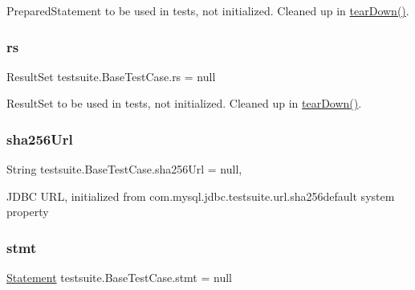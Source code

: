 Prepared\+Statement to be used in tests, not initialized. Cleaned up in \mbox{\hyperlink{classtestsuite_1_1_base_test_case_a51c7d76ab24b0c966f956250fd7a4f52}{tear\+Down()}}. \mbox{\label{classtestsuite_1_1_base_test_case_a31fa73417c178b2baaf37ef1362e37d9}} 
\subsubsection{\texorpdfstring{rs}{rs}}
{\footnotesize\ttfamily Result\+Set testsuite.\+Base\+Test\+Case.\+rs = null\hspace{0.3cm}{\ttfamily [protected]}}

Result\+Set to be used in tests, not initialized. Cleaned up in \mbox{\hyperlink{classtestsuite_1_1_base_test_case_a51c7d76ab24b0c966f956250fd7a4f52}{tear\+Down()}}. \mbox{\label{classtestsuite_1_1_base_test_case_aa0a3676bf28f60f30f04e5ec95327ddd}} 
\subsubsection{\texorpdfstring{sha256\+Url}{sha256Url}}
{\footnotesize\ttfamily String testsuite.\+Base\+Test\+Case.\+sha256\+Url = null\hspace{0.3cm}{\ttfamily [static]}, {\ttfamily [protected]}}

J\+D\+BC U\+RL, initialized from com.\+mysql.\+jdbc.\+testsuite.\+url.\+sha256default system property \mbox{\label{classtestsuite_1_1_base_test_case_a47db7db62d10e395144b1210dc7fd337}} 
\subsubsection{\texorpdfstring{stmt}{stmt}}
{\footnotesize\ttfamily \mbox{\hyperlink{interfacecom_1_1mysql_1_1jdbc_1_1_statement}{Statement}} testsuite.\+Base\+Test\+Case.\+stmt = null\hspace{0.3cm}{\ttfamily [protected]}}

